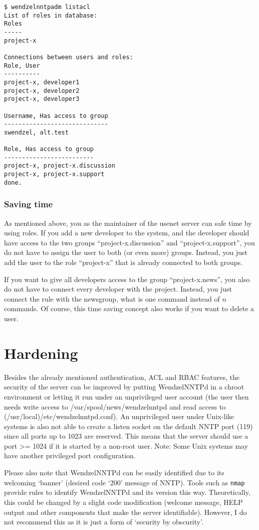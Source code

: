\begin{verbatim}
$ wendzelnntpadm listacl
List of roles in database:
Roles
-----
project-x

Connections between users and roles:
Role, User
----------
project-x, developer1
project-x, developer2
project-x, developer3

Username, Has access to group
-----------------------------
swendzel, alt.test

Role, Has access to group
-------------------------
project-x, project-x.discussion
project-x, project-x.support
done.
\end{verbatim}

\subsubsection{Saving time}

As mentioned above, you as the maintainer of the usenet server can safe time by using roles. If you add a new developer to the system, and the developer should have access to the two groups ``project-x.discussion'' and ``project-x.support'', you do not have to assign the user to both (or even more) groups. Instead, you just add the user to the role ``project-x'' that is already connected to both groups.

If you want to give all developers access to the group ``project-x.news'', you also do not have to connect every developer with the project. Instead, you just connect the rule with the newsgroup, what is one command instead of $n$ commands. Of course, this time saving concept also works if you want to delete a user.

\section{Hardening}

Besides the already mentioned authentication, ACL and RBAC features, the security of the server can be improved by putting WendzelNNTPd in a chroot environment or letting it run under an unprivileged user account (the user then needs write access to /var/spool/news/wendzelnntpd and read access to (/usr/local)/etc/wendzelnntpd.conf). An unprivileged user under Unix-like systems is also not able to create a listen socket on the default NNTP port (119) since all ports up to 1023 are reserved. This means that the server should use a port >= 1024 if it is started by a non-root user. Note: Some Unix systems may have another privileged port configuration. 

Please also note that WendzelNNTPd can be easily identified due to its welcoming `banner' (desired code `200' message of NNTP). Tools such as \texttt{nmap} provide rules to identify WendzelNNTPd and its version this way. Theoretically, this could be changed by a slight code modification (welcome message, HELP output and other components that make the server identifiable). However, I do not recommend this as it is just a form of `security by obscurity'.

